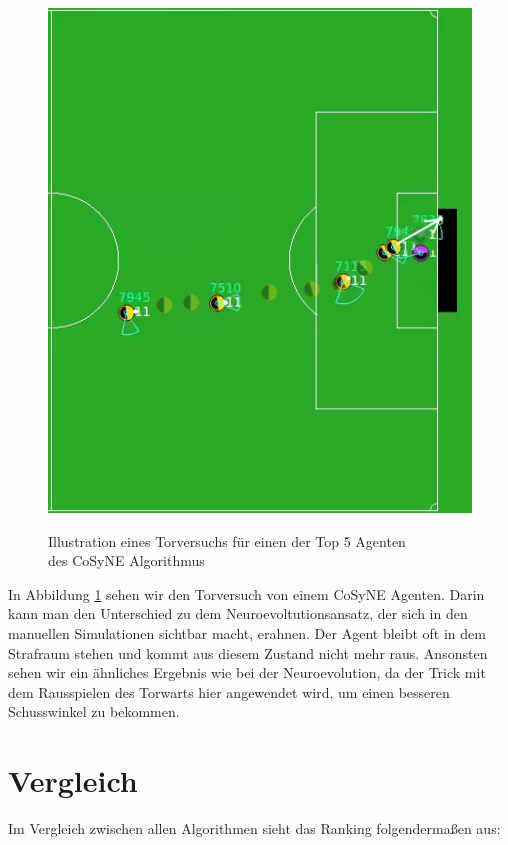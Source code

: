 \newpage
                \begin{figure}[H]
                    \begin{center}
                        \includegraphics[scale=0.83]{../pictures/games/cosyne-gameplay.png}\\
                        \caption{Illustration eines Torversuchs für einen der Top 5 Agenten \\ des CoSyNE Algorithmus \label{fig:cosyne-gameplay}}
                    \end{center}
                \end{figure}

                In Abbildung \ref{fig:cosyne-gameplay} sehen wir den Torversuch von einem CoSyNE Agenten. Darin kann man den Unterschied zu dem Neuroevoltutionsansatz, der sich in den manuellen Simulationen sichtbar macht, erahnen. Der Agent bleibt oft in dem Strafraum stehen und kommt aus diesem Zustand nicht mehr raus. Ansonsten sehen wir ein ähnliches Ergebnis wie bei der Neuroevolution, da der Trick mit dem Rausspielen des Torwarts hier angewendet wird, um einen besseren Schusswinkel zu bekommen.
\newpage

        \section{Vergleich} \label{algo-comparisson}
             Im Vergleich zwischen allen Algorithmen sieht das Ranking folgendermaßen aus:

